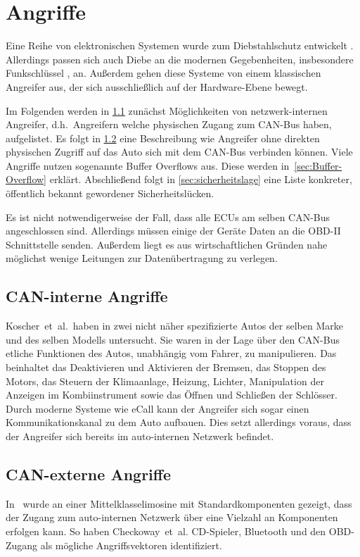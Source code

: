 \section{Angriffe}\label{ch:attack}

Eine Reihe von elektronischen Systemen wurde zum Diebstahlschutz entwickelt
\cite{Song2008,Turner1999,Hwang1997}. Allerdings passen sich auch Diebe an die
modernen Gegebenheiten, insbesondere Funk\-schlüssel \cite{Lee2014}, an. Außerdem
gehen diese Systeme von einem klassischen Angreifer aus, der sich
ausschließlich auf der Hardware-Ebene bewegt.

Im Folgenden werden in \cref{subsec:can-intern-attackers} zunächst
Möglichkeiten von netzwerk-internen Angreifer, d.h.~Angreifern welche
physischen Zugang zum CAN-Bus haben, aufgelistet. Es folgt in
\cref{subsec:can-extern-attackers} eine Beschreibung wie Angreifer ohne
direkten physischen Zugriff auf das Auto sich mit dem CAN-Bus verbinden können.
Viele Angriffe nutzen sogenannte Buffer Overflows aus. Diese werden
in~\cref{sec:Buffer-Overflow} erklärt. Abschließend folgt in
\cref{sec:sicherheitslage} eine Liste konkreter, öffentlich bekannt gewordener
Sicherheitslücken.

Es ist nicht notwendigerweise der Fall, dass alle ECUs am selben CAN-Bus
angeschlossen sind. Allerdings müssen einige der Geräte Daten an die OBD-II
Schnittstelle senden. Außerdem liegt es aus wirtschaftlichen Gründen nahe
möglichst wenige Leitungen zur Datenübertragung zu verlegen.


\subsection{CAN-interne Angriffe}\label{subsec:can-intern-attackers}
Koscher~et~al.~haben in \cite{Koscher2010} zwei nicht näher spezifizierte Autos
der selben Marke und des selben Modells untersucht. Sie waren in der Lage über
den CAN-Bus etliche Funktionen des Autos, unabhängig vom Fahrer, zu
manipulieren. Das beinhaltet das Deaktivieren und Aktivieren der Bremsen, das
Stoppen des Motors, das Steuern der Klimaanlage, Heizung, Lichter, Manipulation
der Anzeigen im Kombiinstrument sowie das Öffnen und Schließen der Schlösser.
Durch moderne Systeme wie eCall kann der Angreifer sich sogar einen
Kommunikationskanal zu dem Auto aufbauen. Dies setzt allerdings voraus, dass
der Angreifer sich bereits im auto-internen Netzwerk befindet.

\subsection{CAN-externe Angriffe}\label{subsec:can-extern-attackers}
In~\cite{Checkoway2011} wurde an einer Mittel\-klasse\-limosine mit
Standard\-komponenten gezeigt, dass der Zugang zum auto-internen Netzwerk über
eine Vielzahl an Komponenten erfolgen kann. So haben Checkoway~et~al.
CD-Spieler, Bluetooth und den OBD-Zugang als mögliche Angriffs\-vektoren
identifiziert.

